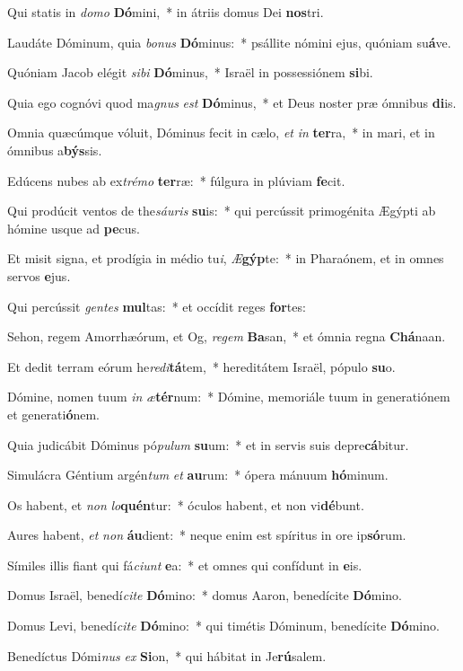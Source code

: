 \item Qui statis in \textit{do}\textit{mo} \textbf{Dó}mini,~* in átriis domus Dei \textbf{nos}tri.
\item Laudáte Dóminum, quia \textit{bo}\textit{nus} \textbf{Dó}minus:~* psállite nómini ejus, quóniam su\textbf{á}ve.
\item Quóniam Jacob elégit \textit{si}\textit{bi} \textbf{Dó}minus,~* Israël in possessiónem \textbf{si}bi.
\item Quia ego cognóvi quod ma\textit{gnus} \textit{est} \textbf{Dó}minus,~* et Deus noster præ ómnibus \textbf{di}is.
\item Omnia quæcúmque vóluit, Dóminus fecit in cælo, \textit{et} \textit{in} \textbf{ter}ra,~* in mari, et in ómnibus a\textbf{býs}sis.
\item Edúcens nubes ab ex\textit{tré}\textit{mo} \textbf{ter}ræ:~* fúlgura in plúviam \textbf{fe}cit.
\item Qui prodúcit ventos de the\textit{sáu}\textit{ris} \textbf{su}is:~* qui percússit primogénita Ægýpti ab hómine usque ad \textbf{pe}cus.
\item Et misit signa, et prodígia in médio tu\textit{i}, \textit{Æ}\textbf{gýp}te:~* in Pharaónem, et in omnes servos \textbf{e}jus.
\item Qui percússit \textit{gen}\textit{tes} \textbf{mul}tas:~* et occídit reges \textbf{for}tes:
\item Sehon, regem Amorrhæórum, et Og, \textit{re}\textit{gem} \textbf{Ba}san,~* et ómnia regna \textbf{Chá}naan.
\item Et dedit terram eórum he\textit{re}\textit{di}\textbf{tá}tem,~* hereditátem Israël, pópulo \textbf{su}o.
\item Dómine, nomen tuum \textit{in} \textit{æ}\textbf{tér}num:~* Dómine, memoriále tuum in generatiónem et generati\textbf{ó}nem.
\item Quia judicábit Dóminus pó\textit{pu}\textit{lum} \textbf{su}um:~* et in servis suis depre\textbf{cá}bitur.
\item Simulácra Géntium argén\textit{tum} \textit{et} \textbf{au}rum:~* ópera mánuum \textbf{hó}minum.
\item Os habent, et \textit{non} \textit{lo}\textbf{quén}tur:~* óculos habent, et non vi\textbf{dé}bunt.
\item Aures habent, \textit{et} \textit{non} \textbf{áu}dient:~* neque enim est spíritus in ore ip\textbf{só}rum.
\item Símiles illis fiant qui fá\textit{ci}\textit{unt} \textbf{e}a:~* et omnes qui confídunt in \textbf{e}is.
\item Domus Israël, benedí\textit{ci}\textit{te} \textbf{Dó}mino:~* domus Aaron, benedícite \textbf{Dó}mino.
\item Domus Levi, benedí\textit{ci}\textit{te} \textbf{Dó}mino:~* qui timétis Dóminum, benedícite \textbf{Dó}mino.
\item Benedíctus Dómi\textit{nus} \textit{ex} \textbf{Si}on,~* qui hábitat in Je\textbf{rú}salem.
